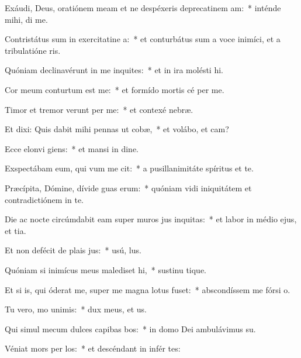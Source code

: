 \item Exáudi, Deus, oratiónem meam et ne despéxeris deprecatinem am:~* inténde mihi,  di me.
\item Contristátus sum in exercitatine a:~* et conturbátus sum a voce inimíci, et a tribulatióne ris.
\item Quóniam declinavérunt in me inquites:~* et in ira molésti  hi.
\item Cor meum conturtum est  me:~* et formído mortis cé per me.
\item Timor et tremor verunt per me:~* et contexé  nebræ.
\item Et dixi: Quis dabit mihi pennas ut cobæ,~* et volábo, et cam?
\item Ecce elonvi giens:~* et mansi in dine.
\item Exspectábam eum, qui vum me cit:~* a pusillanimitáte spíritus et te.
\item Præcípita, Dómine, dívide guas erum:~* quóniam vidi iniquitátem et contradictiónem in te.
\item Die ac nocte circúmdabit eam super muros jus inquitas:~* et labor in médio ejus, et tia.
\item Et non defécit de plais jus:~* usú,  lus.
\item Quóniam si inimícus meus malediset hi,~* sustinu tique.
\item Et si is, qui óderat me, super me magna lotus fuset:~* abscondíssem me fórsi  o.
\item Tu vero, mo unimis:~* dux meus, et  us.
\item Qui simul mecum dulces capibas bos:~* in domo Dei ambulávimus  su.
\item Véniat mors per los:~* et descéndant in infér tes:
